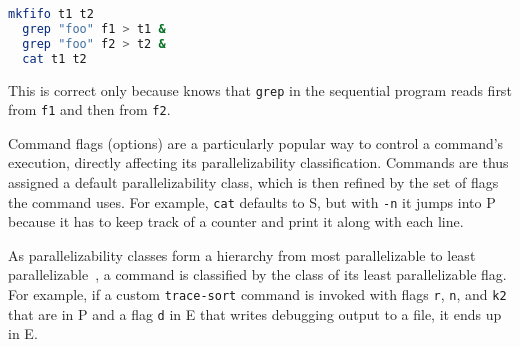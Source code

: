 \documentclass[letterpaper,twocolumn,10pt]{article}
\newcommand{\heading}[1]{\vspace{4pt}\noindent\textbf{#1}\enspace}
\newcommand{\ttt}[1]{\texttt{#1}}
\newcommand{\cn}[1]{\mbox{\textcircled{\footnotesize #1}}}
\newcommand{\sta}{\cn{\textsc{S}}\xspace}
\newcommand{\pur}{\cn{\textsc{P}}\xspace}
\newcommand{\sid}{\cn{\textsc{E}}\xspace}
\begin{document}
\begin{lstlisting}[language=sh, numbers=none]
  mkfifo t1 t2
  grep "foo" f1 > t1 &
  grep "foo" f2 > t2 &
  cat t1 t2
\end{lstlisting}

\noindent
This is correct only because \sys knows that \ttt{grep} in the sequential program reads first from \ttt{f1} and then from \ttt{f2}.

Command flags (options) are a particularly popular way to control a command's execution, directly affecting its parallelizability classification.
Commands are thus assigned a default parallelizability class, which is then refined by the set of flags the command uses.
For example, \ttt{cat} defaults to \sta, but with \ttt{-n} it jumps into \pur because it has to keep track of a counter and print it along with each line.

As parallelizability classes form a hierarchy from most parallelizable to least parallelizable~, a command is classified by the class of its least parallelizable flag.
For example, if a custom \ttt{trace-sort} command is invoked with flags \ttt{r}, \ttt{n}, and \ttt{k2} that are in \pur and a flag \ttt{d} in \sid that writes debugging output to a file, it ends up in \sid.





\end{document}
